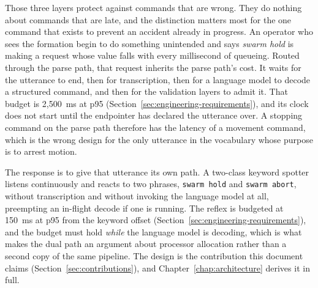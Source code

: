 Those three layers protect against commands that are wrong. They do nothing about commands that
are late, and the distinction matters most for the one command that exists to prevent an accident
already in progress. An operator who sees the formation begin to do something unintended and says
\emph{swarm hold} is making a request whose value falls with every millisecond of queueing. Routed
through the parse path, that request inherits the parse path's cost. It waits for the utterance to
end, then for transcription, then for a language model to decode a structured command, and then
for the validation layers to admit it. That budget is 2{,}500~ms at p95
(Section~\ref{sec:engineering-requirements}), and its clock does not start until the endpointer has
declared the utterance over. A stopping command on the parse path therefore has the latency of a
movement command, which is the wrong design for the only utterance in the vocabulary whose purpose
is to arrest motion.

The response is to give that utterance its own path. A two-class keyword spotter listens
continuously and reacts to two phrases, \texttt{swarm hold} and \texttt{swarm abort}, without
transcription and without invoking the language model at all, preempting an in-flight decode if
one is running. The reflex is budgeted at 150~ms at p95 from the keyword offset
(Section~\ref{sec:engineering-requirements}), and the budget must hold \emph{while} the language
model is decoding, which is what makes the dual path an argument about processor allocation rather
than a second copy of the same pipeline. The design is the contribution this document claims
(Section~\ref{sec:contributions}), and Chapter~\ref{chap:architecture} derives it in full.


